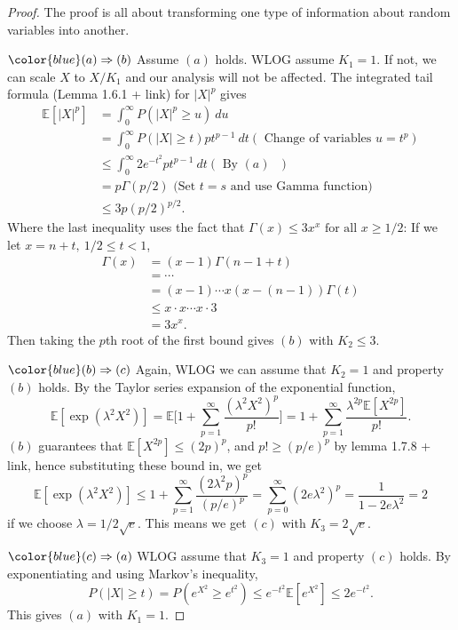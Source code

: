 \begin{proof}
The proof is all about transforming one type of information about random variables into another.

$\color{blue} (a) \Rightarrow (b)$ Assume $(a)$ holds. WLOG assume $K_1 = 1$. If not, 
we can scale $X$ to $X / K_1$ and our 
analysis will not be affected. The integrated tail formula (Lemma 1.6.1 + link) for $|X|^p$ gives 
\begin{align*}
	\mathbb{E}[|X|^p] 
	&= \int_{0}^{\infty} P(|X|^p \geq u) \ du \\
	&= \int_{0}^{\infty} P(|X| \geq t) pt^{p - 1} \ dt (\text{ Change of variables } u = t^p) \\
	&\leq \int_{0}^{\infty} 2e^{-t^2} pt^{p - 1} \ dt (\text{ By $(a)$ }) \\
	&= p \Gamma(p / 2) \text{ (Set $t = s$ and use Gamma function) } \\
	&\leq 3p(p/2)^{p/2}.
\end{align*}
Where the last inequality uses the fact that $\Gamma(x) \leq 3x^x \text{ for all } x \geq 1/2$: If we let 
$x = n + t, \ 1/2 \leq t < 1$, 
\begin{align*}
	\Gamma(x) 
	&= (x - 1) \Gamma(n - 1 + t) \\
	&= \cdots \\
	&= (x - 1) \cdots x(x - (n - 1)) \Gamma(t) \\
	&\leq x \cdot x \cdots x \cdot 3 \\
	&= 3x^x.
\end{align*}
Then taking the $p$th root of the first bound gives $(b)$ with $K_2 \leq 3$.

$\color{blue} (b) \Rightarrow (c)$ Again, WLOG we can assume that $K_2 = 1$ and property $(b)$ holds. 
By the Taylor series expansion of the exponential function, 
\[ \mathbb{E}[\exp{(\lambda^2 X^2)}] 
= \mathbb{E}\biggl[ 1 + \sum_{p = 1}^{\infty} \frac{(\lambda^2 X^2)^p}{p!} \biggr] 
= 1 + \sum_{p = 1}^{\infty} \frac{\lambda^{2p} \mathbb{E}[X^{2p}]}{p!}. \]
$(b)$ guarantees that $\mathbb{E}[X^{2p}] \leq (2p)^p$, and $p! \geq (p / e)^p$ by lemma 1.7.8 + link, 
hence substituting these bound in, we get 
\[ \mathbb{E}[\exp{(\lambda^2 X^2)}] 
\leq 1 + \sum_{p = 1}^{\infty} \frac{(2 \lambda^2 p)^p}{(p / e)^p} 
= \sum_{p = 0}^{\infty} (2e \lambda^2)^p 
= \frac{1}{1 - 2e \lambda^2} = 2 \]
if we choose $\lambda = 1 / 2 \sqrt{e}$. This means we get $(c)$ with $K_3 = 2 \sqrt{e}$. 

$\color{blue} (c) \Rightarrow (a)$ WLOG assume that $K_3 = 1$ and property $(c)$ holds. By exponentiating 
and using Markov's inequality, 
\[ P(|X| \geq t) = P(e^{X^2} \geq e^{t^2}) \leq e^{-t^2} \mathbb{E}[e^{X^2}] \leq 2e^{-t^2}. \]
This gives $(a)$ with $K_1 = 1$.


\end{proof}
